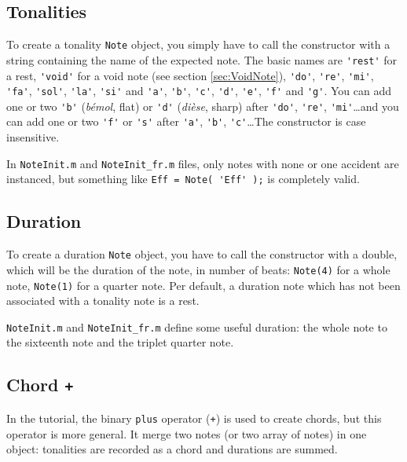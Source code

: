 \documentclass{article}
\newcommand\noteInitFile{\texttt{NoteInit.m}\xspace}
\newcommand\noteInitFrFile{\texttt{NoteInit\_fr.m}\xspace}
\begin{document}
\subsection{Tonalities}
\label{sec:Tonalities}

To create a tonality \lstinline!Note! object, you simply have to call the constructor with a string containing the name of the expected note. The basic names are \lstinline!'rest'! for a rest, \lstinline!'void'! for a void note (see section \ref{sec:VoidNote}), \lstinline!'do'!, \lstinline!'re'!, \lstinline!'mi'!, \lstinline!'fa'!, \lstinline!'sol'!, \lstinline!'la'!, \lstinline!'si'! and \lstinline!'a'!, \lstinline!'b'!, \lstinline!'c'!, \lstinline!'d'!, \lstinline!'e'!, \lstinline!'f'! and \lstinline!'g'!. You can add one or two \lstinline!'b'! (\emph{b\'emol}, flat) or \lstinline!'d'! (\emph{di\`ese}, sharp) after \lstinline!'do'!, \lstinline!'re'!, \lstinline!'mi'!\dots and you can add one or two \lstinline!'f'! or \lstinline!'s'! after \lstinline!'a'!, \lstinline!'b'!, \lstinline!'c'!\dots The constructor is case insensitive.

In \noteInitFile and \noteInitFrFile files, only notes with none or one accident are instanced, but something like \lstinline!Eff = Note( 'Eff' );! is completely valid.

\subsection{Duration}
\label{sec:Duration}

To create a duration \lstinline!Note! object, you have to call the constructor with a double, which will be the duration of the note, in number of beats: \lstinline!Note(4)! for a whole note, \lstinline!Note(1)! for a quarter note. Per default, a duration note which has not been associated with a tonality note is a rest.

\noteInitFile and \noteInitFrFile define some useful duration: the whole note to the sixteenth note and the triplet quarter note.

\subsection{Chord \lstinline!+!}
\label{sec:Chord}

In the tutorial, the binary \lstinline!plus! operator (\lstinline!+!) is used to create chords, but this operator is more general. It merge two notes (or two array of notes) in one object: tonalities are recorded as a chord and durations are summed.
\end{document}
